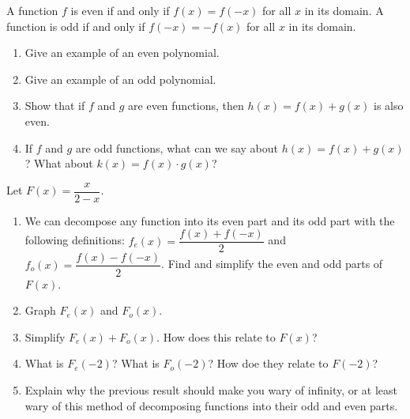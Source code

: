 \documentclass{amsbook}
\begin{document}
\begin{Exercise}[title={Polynomials II}, difficulty =0, label=1a3]
   A function $f$ is even if and only if $f(x)=f(-x)$ for all $x$ in its domain. A function is odd if and only if $f(-x)= - f(x)$ for all $x$ in its domain.
   	\begin{enumerate}
   		\item Give an example of an even polynomial.
   		\item Give an example of an odd polynomial.
   		\item Show that if $f$ and $g$ are even functions, then $h(x)=f(x)+g(x)$ is also even.
   		\item If $f$ and $g$ are odd functions, what can we say about $h(x)=f(x)+g(x)$? What about $k(x)=f(x)\cdot g(x)$?
   	\end{enumerate}
\end{Exercise}

\begin{Answer}[ref={1a3}]

\end{Answer}

\begin{Exercise}[title={Infinity is Not a Number}, difficulty =1, label=1a4]
   Let $F(x)=\dfrac{x}{2-x}$.\\
   	\begin{enumerate}
   		\item We can decompose any function into its even part and its odd part with the following definitions: $f_e(x) =\dfrac{ f(x)+f(-x)}{2}$ and $f_o(x)=\dfrac{f(x)-f(-x)}{2}$.  Find and simplify the even and odd parts of $F(x)$.
   		\item Graph $F_e(x)$ and $F_o(x)$.
   		\item Simplify $F_e(x) + F_o(x)$. How does this relate to $F(x)$?
   		\item What is $F_e(-2)$? What is $F_o(-2)$? How doe they relate to $F(-2)$?
   		\item Explain why the previous result should make you wary of infinity, or at least wary of this method of decomposing functions into their odd and even parts.
   	\end{enumerate}
\end{Exercise}

\begin{Answer}[ref={1a4}]

\end{Answer}


\end{document}
